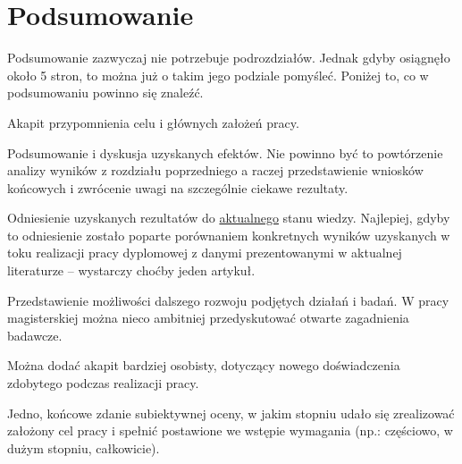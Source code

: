 \chapter{Podsumowanie}
\label{ch:podsumowanie}

Podsumowanie zazwyczaj nie potrzebuje podrozdziałów. Jednak gdyby osiągnęło około 5 stron, to można już o takim jego podziale pomyśleć. Poniżej to, co w podsumowaniu powinno się znaleźć.

Akapit przypomnienia celu i głównych założeń pracy.

Podsumowanie i dyskusja uzyskanych efektów. Nie powinno być to powtórzenie analizy wyników z rozdziału poprzedniego a raczej przedstawienie wniosków końcowych i zwrócenie uwagi na szczególnie ciekawe rezultaty.

Odniesienie uzyskanych rezultatów do \underline{aktualnego} stanu wiedzy. Najlepiej, gdyby to odniesienie zostało poparte porównaniem konkretnych wyników uzyskanych w toku realizacji pracy dyplomowej z danymi prezentowanymi w aktualnej literaturze -- wystarczy choćby jeden artykuł.

Przedstawienie możliwości dalszego rozwoju podjętych działań i badań. W pracy magisterskiej można nieco ambitniej przedyskutować otwarte zagadnienia badawcze.

Można dodać akapit bardziej osobisty, dotyczący nowego doświadczenia zdobytego podczas realizacji pracy.

Jedno, końcowe zdanie subiektywnej oceny, w jakim stopniu udało się zrealizować założony cel pracy i spełnić postawione we wstępie wymagania (np.: częściowo, w dużym stopniu, całkowicie).